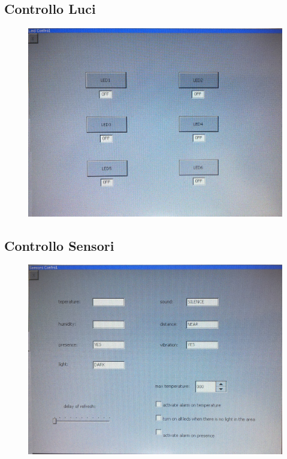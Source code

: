 \documentclass[a4paper,titlepage]{book}
\begin{document}
\newpage
\subsection{Controllo Luci}

\begin{figure}[!h]
\centering
\includegraphics[scale=0.1]{ledgui.jpg}
\end{figure}

\newpage
\subsection{Controllo Sensori}

\begin{figure}[!h]
\centering
\includegraphics[scale=0.1]{sensorgui.jpg}
\end{figure}
\end{document}
